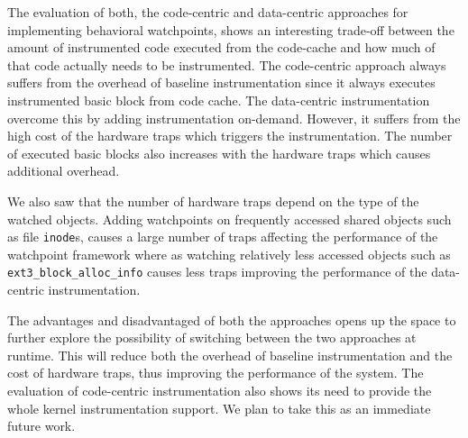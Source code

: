  The evaluation of both, the code-centric and data-centric approaches for implementing behavioral watchpoints, shows an interesting trade-off between the amount of instrumented code executed from the code-cache and how much of that code actually needs to be instrumented. The code-centric approach always suffers from the overhead of baseline instrumentation since it always executes instrumented basic block from code cache. The data-centric instrumentation overcome this by adding instrumentation on-demand. However, it suffers from the high cost of the hardware traps which triggers the instrumentation. The number of executed basic blocks also increases with the hardware traps which causes additional overhead.

 We also saw that the number of hardware traps depend on the type of the watched objects. Adding watchpoints on frequently accessed shared objects such as file \texttt{inode}s, causes a large number of traps affecting the performance of the watchpoint framework where as watching relatively less accessed objects such as \texttt{ext3\_block\_alloc\_info} causes less traps improving the performance of the data-centric instrumentation.

 The advantages and disadvantaged of both the approaches opens up the space to further explore the possibility of switching between the two approaches at runtime. This will reduce both the overhead of baseline instrumentation and the cost of hardware traps, thus improving the performance of the system. The evaluation of code-centric instrumentation also shows its need to provide the whole kernel instrumentation support. We plan to take this as an immediate future work.












